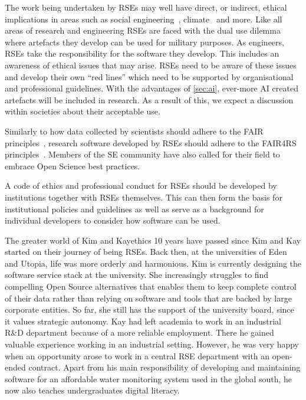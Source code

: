 \documentclass{eceasst}
\begin{document}
The work being undertaken by RSEs may well have direct, or indirect,
ethical implications in areas such as social engineering~\cite{s2erc,Siadati2024},
climate~\cite{Lannelongue2023} and more.
Like all areas of research and engineering RSEs are faced with the dual use dilemma~\cite{Bobier2024} where artefacts they develop can be used for military purposes.
As engineers, RSEs take the responsibility for the software they develop.
This includes an awareness of ethical issues that may arise.
RSEs need to be aware of these issues and develop their own ``red lines''
which need to be supported by organisational and professional guidelines.
With the advantages of \autoref{sec:ai}, ever-more AI created artefacts will be included in research.
As a result of this, we expect a discussion within societies about their acceptable use.

Similarly to how data collected by scientists should adhere to the FAIR principles~\cite{FAIR},
research software developed by RSEs should adhere to the FAIR4RS principles~\cite{FAIR4RS}.
Members of the SE community have also called for their field to embrace Open Science best practices\cite{OliveiraJr2024,Druskat2025}.

A code of ethics and professional conduct for RSEs should be developed by institutions together with RSEs themselves.
This can then form the basis for institutional policies and guidelines as well as serve as a background for individual developers to consider how software can be used.

\begin{story}{The greater world of Kim and Kay}{ethics}
10 years have passed since Kim and Kay started on their journey of being RSEs. Back then,
at the universities of Eden and Utopia, life was more orderly and harmonious.
Kim is currently designing the software service stack at the university.
She increasingly struggles to find compelling Open Source alternatives that enables them to keep complete control of their data
rather than relying on software and tools that are backed by large corporate entities.
So far, she still has the support of the university board, since it values strategic autonomy.
Kay had left academia to work in an industrial R\&D department because of a more reliable employment.
There he gained valuable experience working in an industrial setting.
However, he was very happy when an opportunity arose to work in a central
RSE department with an open-ended contract. Apart from his main responsibility
of developing and maintaining software for an affordable water monitoring system
used in the global south, he now also teaches undergraduates digital literacy.
\end{story}
\end{document}
